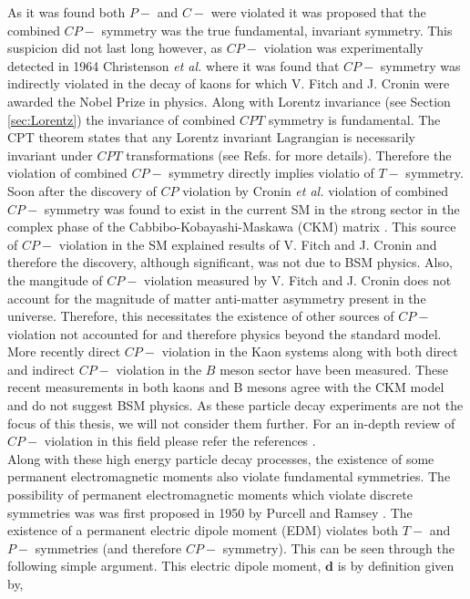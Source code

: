 \documentclass[10pt,a4paper, twoside]{report}
\begin{document}
As it was found both $P-$ and $C-$ were violated it was proposed that the combined $CP-$ symmetry was the true fundamental, invariant symmetry. This suspicion did not last long however, as  $CP-$ violation was experimentally detected in 1964 Christenson \textit{et al.} \cite{Christenson1964} where it was found that $CP-$ symmetry was indirectly violated in the decay of kaons for which V. Fitch and J. Cronin  were awarded the Nobel Prize in physics. Along with Lorentz invariance (see Section \ref{sec:Lorentz}) the invariance of combined $CPT$ symmetry is fundamental. The CPT theorem states that any Lorentz invariant Lagrangian is necessarily invariant under $CPT$ transformations (see Refs. \cite{LandauVol4, KhriplovichCP, HenleyCP} for more details). Therefore the violation of combined $CP-$ symmetry directly implies violatio of $T-$ symmetry.  Soon after the discovery of $CP$ violation by Cronin \textit{et al.} violation of combined $CP-$ symmetry was found to exist in the current SM in the strong sector in the complex phase of the Cabbibo-Kobayashi-Maskawa (CKM) matrix \cite{Cabibbo1963, KM1973}. This source of $CP-$ violation in the SM explained results of V. Fitch and J. Cronin and therefore the discovery, although significant, was not due to BSM physics. Also, the mangitude of  $CP-$ violation measured by V. Fitch and J. Cronin does not account for the magnitude of matter anti-matter asymmetry present in the universe. Therefore, this necessitates the existence of other sources of $CP-$ violation not accounted for and therefore physics beyond the standard model. More recently direct $CP-$ violation in the Kaon systems \cite{Alavi1999, Fanti1999} along with both direct and indirect $CP-$ violation in the $B$ meson sector \cite{Belle2001, Aaij2013, Aubert2003} have been measured. These recent measurements in both kaons and B mesons agree with the CKM model and do not suggest BSM physics.  As these particle decay experiments are not the focus of this thesis, we will not  consider them further. For an in-depth review of $CP-$ violation in this field please refer the references \cite{}. \\
\linebreak
Along with these high energy particle decay processes, the existence of some permanent electromagnetic moments also violate fundamental symmetries. The possibility of permanent electromagnetic moments which violate  discrete symmetries was was first proposed in 1950 by Purcell and Ramsey  \cite{Purcell1950}. The existence of a permanent electric dipole moment (EDM) violates both $T-$ and $P-$ symmetries (and therefore $CP-$ symmetry)\cite{Landau1957}. This can be seen through the following simple argument. This electric dipole moment, $\textbf{d}$ is by definition given by,  
\end{document}
